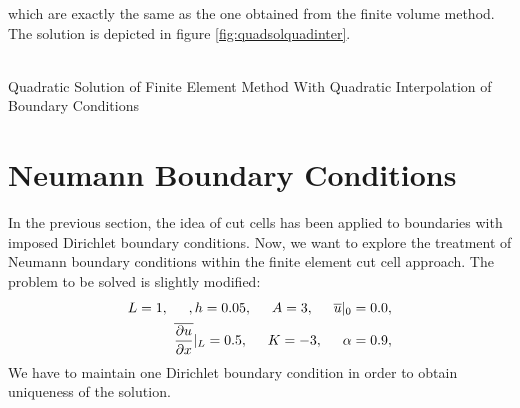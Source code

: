\documentclass[a4paper,12pt]{article}
\makeatletter
\newenvironment{figurehere}
  {\def\@captype{figure}}
  {}
\makeatother
\begin{document}
which are exactly the same as the one obtained from the finite volume method.
The solution is depicted in figure \ref{fig:quadsolquadinter}.\\
\begin{center}
\begin{figurehere}
\\
\caption{Quadratic Solution of Finite Element Method With Quadratic Interpolation of Boundary Conditions}\label{fig:quadsolquadinter}
\end{figurehere}
\end{center}
\section{Neumann Boundary Conditions}
In the previous section, the idea of cut cells has been applied to boundaries with imposed Dirichlet boundary conditions. Now, we want to explore the treatment of Neumann boundary conditions within the finite element cut cell approach.
The problem to be solved is slightly modified:
\begin{eqnarray}
L = 1, \hspace{0.5cm}, h = 0.05, \hspace{0.5cm}A= 3, \hspace{0.5cm}\overline{u}\vert_0 = 0.0,\\ 
\overline{\frac{\partial u}{\partial x}}\vert_L=0.5, \hspace{0.5cm}K = -3,\hspace{0.5cm}\alpha = 0.9,
\end{eqnarray}
We have to maintain one Dirichlet boundary condition in order to obtain uniqueness of the solution.\\
\end{document}
